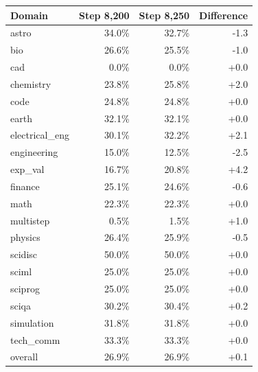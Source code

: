 \begin{tabular}{lrrr}
\toprule
Domain & Step 8,200 & Step 8,250 & Difference \\
\midrule
astro & 34.0\% & 32.7\% & -1.3 \\
bio & 26.6\% & 25.5\% & -1.0 \\
cad & 0.0\% & 0.0\% & +0.0 \\
chemistry & 23.8\% & 25.8\% & +2.0 \\
code & 24.8\% & 24.8\% & +0.0 \\
earth & 32.1\% & 32.1\% & +0.0 \\
electrical\_eng & 30.1\% & 32.2\% & +2.1 \\
engineering & 15.0\% & 12.5\% & -2.5 \\
exp\_val & 16.7\% & 20.8\% & +4.2 \\
finance & 25.1\% & 24.6\% & -0.6 \\
math & 22.3\% & 22.3\% & +0.0 \\
multistep & 0.5\% & 1.5\% & +1.0 \\
physics & 26.4\% & 25.9\% & -0.5 \\
scidisc & 50.0\% & 50.0\% & +0.0 \\
sciml & 25.0\% & 25.0\% & +0.0 \\
sciprog & 25.0\% & 25.0\% & +0.0 \\
sciqa & 30.2\% & 30.4\% & +0.2 \\
simulation & 31.8\% & 31.8\% & +0.0 \\
tech\_comm & 33.3\% & 33.3\% & +0.0 \\
overall & 26.9\% & 26.9\% & +0.1 \\
\bottomrule
\end{tabular}
